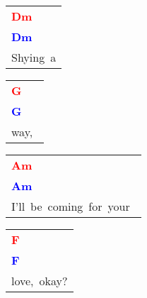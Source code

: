 \documentclass[12pt,a4paper,openany,UTF8]{memoir}
\begin{document}
\begin{tabular}[b]{l}
    \textbf{\textcolor{red}{Dm\ }}\\\textbf{\textcolor{blue}{Dm\ }}\\
    Shying~a\mbox{}\end{tabular}\begin{tabular}[b]{l}
    \textbf{\textcolor{red}{G\ }}\\\textbf{\textcolor{blue}{G\ }}\\
    way,~\mbox{}\end{tabular}\begin{tabular}[b]{l}
    \textbf{\textcolor{red}{Am\ }}\\\textbf{\textcolor{blue}{Am\ }}\\
    I'll~be~coming~for~your~\mbox{}\end{tabular}\begin{tabular}[b]{l}
    \textbf{\textcolor{red}{F\ }}\\\textbf{\textcolor{blue}{F\ }}\\
    love,~okay?\mbox{}\end{tabular}

    \vspace{\parskip}
\end{document}
